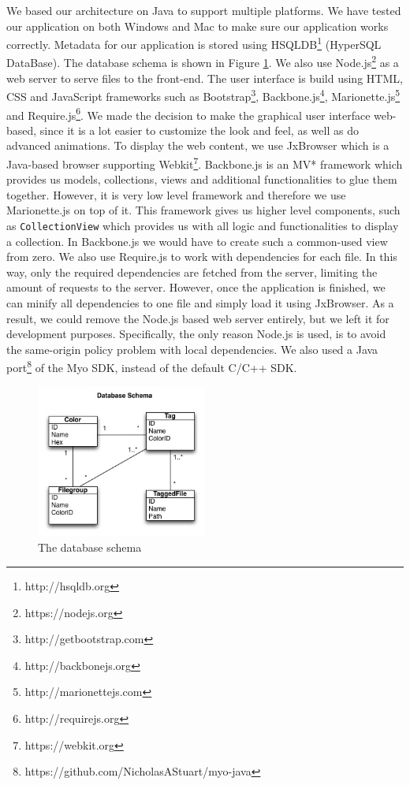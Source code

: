 \documentclass{article}
\begin{document}
We based our architecture on Java to support multiple platforms. We have tested our application on both Windows and Mac to make sure our application works correctly. Metadata for our application is stored using HSQLDB\footnote{http://hsqldb.org} (HyperSQL DataBase). The database schema is shown in Figure \ref{dbmodel}. We also use Node.js\footnote{https://nodejs.org} as a web server to serve files to the front-end. The user interface is build using HTML, CSS and JavaScript frameworks such as Bootstrap\footnote{http://getbootstrap.com}, Backbone.js\footnote{http://backbonejs.org}, Marionette.js\footnote{http://marionettejs.com} and Require.js\footnote{http://requirejs.org}. We made the decision to make the graphical user interface web-based, since it is a lot easier to customize the look and feel, as well as do advanced animations. To display the web content, we use JxBrowser which is a Java-based browser supporting Webkit\footnote{https://webkit.org}. Backbone.js is an MV* framework which provides us models, collections, views and additional functionalities to glue them together. However, it is very low level framework and therefore we use Marionette.js on top of it. This framework gives us higher level components, such as \texttt{CollectionView} which provides us with all logic and functionalities to display a collection. In Backbone.js we would have to create such a common-used view from zero. We also use Require.js to work with dependencies for each file. In this way, only the required dependencies are fetched from the server, limiting the amount of requests to the server. However, once the application is finished, we can minify all dependencies to one file and simply load it using JxBrowser. As a result, we could remove the Node.js based web server entirely, but we left it for development purposes. Specifically, the only reason Node.js is used, is to avoid the same-origin policy problem with local dependencies. We also used a Java port\footnote{https://github.com/NicholasAStuart/myo-java} of the Myo SDK, instead of the default C/C++ SDK.

\begin{figure}[!ht]
  \centering
      \centerline{\includegraphics[width=0.5\textwidth]{Images/database.jpg}}
  \caption{The database schema}
	\label{dbmodel}
\end{figure}
\end{document}
